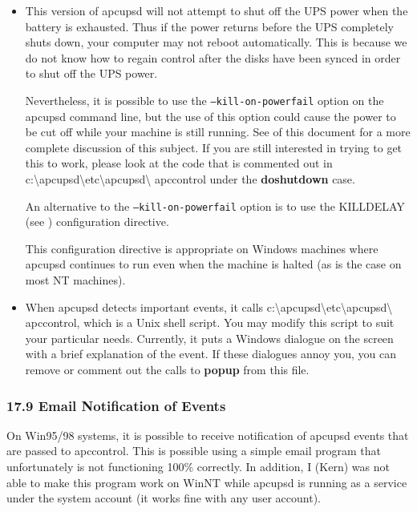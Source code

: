 \begin{itemize}
\item This version of apcupsd will not attempt to shut off the UPS power when
the battery is exhausted. Thus if the power returns before the UPS completely
shuts down, your computer may not reboot automatically. This is because we do
not know how to regain control after the disks have been synced in order to
shut off the UPS power.  

Nevertheless, it is possible to use the {\tt --kill-on-powerfail} option on
the apcupsd command line, but the use of this option could cause the power to
be cut off while your machine is still running. See 
 of this
document for a more complete discussion of this subject. If you are still
interested in trying to get this to work, please look at the code that is
commented out in
c:\textbackslash{}apcupsd\textbackslash{}etc\textbackslash{}apcupsd\textbackslash
{}apccontrol under the {\bf doshutdown} case.  

An alternative to the {\tt --kill-on-powerfail} option is to use the KILLDELAY
(see 
) configuration
directive.  

This configuration directive is appropriate on Windows machines where apcupsd
continues to run even when the machine is halted (as is the case on most NT
machines).  
\item When apcupsd detects important events, it calls
c:\textbackslash{}apcupsd\textbackslash{}etc\textbackslash{}apcupsd\textbackslash
{}apccontrol, which is a Unix shell script. You may modify this script to suit
your particular needs.  Currently, it puts a Windows dialogue on the screen
with a brief explanation of the event. If these dialogues annoy you, you can
remove or comment out the calls to {\bf popup} from this file. 
\end{itemize}

\label{Email-Notification-of-Events}

\subsubsection*{17.9 Email Notification of Events}

\label{index-Email-181}
\label{index-Notification_002c-Email-182}
On Win95/98 systems, it is possible to receive notification of apcupsd events
that are passed to apccontrol. This is possible using a simple email program
that unfortunately is not functioning 100\% correctly. In addition, I (Kern)
was not able to make this program work on WinNT while apcupsd is running as a
service under the system account (it works fine with any user account).  

